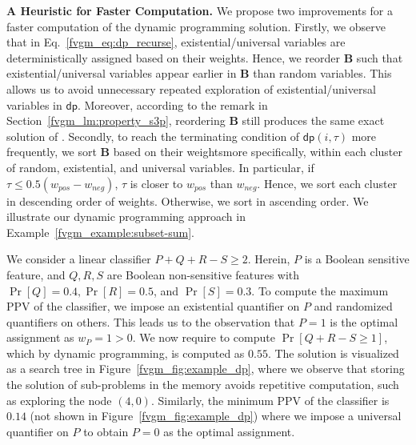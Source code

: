 \textbf{A Heuristic for Faster Computation.} 
We propose two improvements for a faster computation of the dynamic programming solution. Firstly, we observe that in Eq.~\eqref{fvgm_eq:dp_recurse}, existential/universal variables are deterministically  assigned based on their weights. Hence, we reorder $ \mathbf{B} $ such that existential/universal variables appear earlier in $ \mathbf{B} $ than random variables. This allows us to avoid unnecessary repeated exploration of existential/universal variables in $ \mathsf{dp} $. Moreover, according to the remark in Section~\ref{fvgm_lm:property_s3p}, reordering $ \mathbf{B} $ still produces the same exact solution of {\stochastic}. Secondly, to reach the terminating condition of $ \mathsf{dp}(i, \tau) $ more frequently, we sort $ \mathbf{B} $ based on their weights\textemdash more specifically, within each cluster of random, existential, and universal variables. In particular, if $ \tau \le 0.5(w_{pos} - w_{neg}) $, $ \tau $ is closer to $ w_{pos} $ than $ w_{neg} $. Hence, we sort each cluster in descending order of weights. Otherwise,  we sort in ascending order. We illustrate our dynamic programming approach in Example~\ref{fvgm_example:subset-sum}.
	
\begin{example}\label{fvgm_example:subset-sum}
We consider a linear classifier $ P + Q + R - S \ge 2$. Herein, $ P $ is a Boolean sensitive feature, and $ Q, R, S $ are Boolean non-sensitive features with $ \Pr[Q] = 0.4,  \Pr[R] = 0.5 $, and $ \Pr[S] = 0.3 $. To compute the maximum PPV of the classifier,  we impose an existential quantifier on $P$ and randomized quantifiers on others. This leads us to the observation that $ P = 1 $ is the optimal assignment as $ w_P = 1 > 0 $. We now require to compute $ \Pr[Q + R - S \ge 1] $, which by dynamic programming, is computed as $ 0.55 $. The solution is visualized as a search tree in Figure~\ref{fvgm_fig:example_dp}, where we observe that storing the solution of sub-problems in the memory avoids repetitive computation, such as exploring the node $ (4,0) $. Similarly, the minimum PPV  of the classifier is $ 0.14 $ (not shown in Figure~\ref{fvgm_fig:example_dp}) where we impose a universal quantifier on $P$ to obtain $ P = 0 $ as the optimal assignment. 
\end{example}

	
	